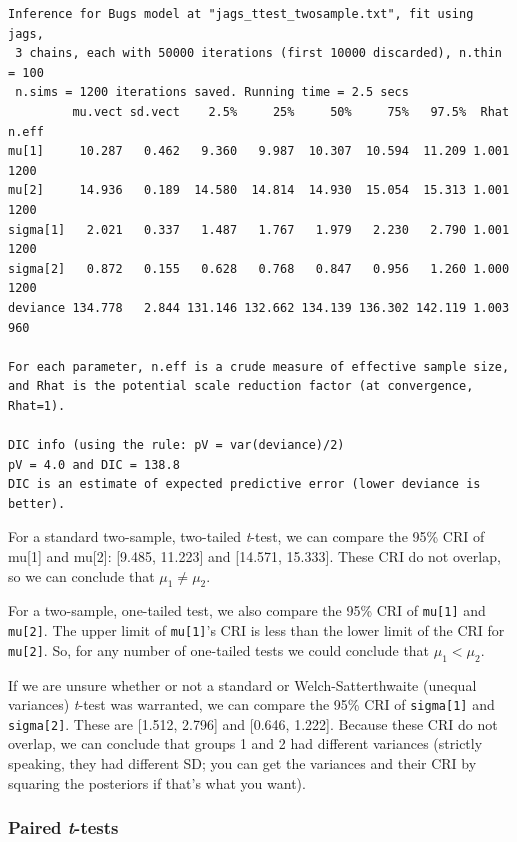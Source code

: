 \documentclass[
  13,
  letterpaper,
]{report}
\begin{document}
\begin{verbatim}
Inference for Bugs model at "jags_ttest_twosample.txt", fit using jags,
 3 chains, each with 50000 iterations (first 10000 discarded), n.thin = 100
 n.sims = 1200 iterations saved. Running time = 2.5 secs
         mu.vect sd.vect    2.5%     25%     50%     75%   97.5%  Rhat n.eff
mu[1]     10.287   0.462   9.360   9.987  10.307  10.594  11.209 1.001  1200
mu[2]     14.936   0.189  14.580  14.814  14.930  15.054  15.313 1.001  1200
sigma[1]   2.021   0.337   1.487   1.767   1.979   2.230   2.790 1.001  1200
sigma[2]   0.872   0.155   0.628   0.768   0.847   0.956   1.260 1.000  1200
deviance 134.778   2.844 131.146 132.662 134.139 136.302 142.119 1.003   960

For each parameter, n.eff is a crude measure of effective sample size,
and Rhat is the potential scale reduction factor (at convergence, Rhat=1).

DIC info (using the rule: pV = var(deviance)/2)
pV = 4.0 and DIC = 138.8
DIC is an estimate of expected predictive error (lower deviance is better).
\end{verbatim}

For a standard two-sample, two-tailed \emph{t}-test, we can compare the
95\% CRI of mu{[}1{]} and mu{[}2{]}: {[}9.485, 11.223{]} and {[}14.571,
15.333{]}. These CRI do not overlap, so we can conclude that
\(\mu_1\neq\mu_2\).

For a two-sample, one-tailed test, we also compare the 95\% CRI of
\texttt{mu{[}1{]}} and \texttt{mu{[}2{]}}. The upper limit of
\texttt{mu{[}1{]}}'s CRI is less than the lower limit of the CRI for
\texttt{mu{[}2{]}}. So, for any number of one-tailed tests we could
conclude that \(\mu_1<\mu_2\).

If we are unsure whether or not a standard or Welch-Satterthwaite
(unequal variances) \emph{t}-test was warranted, we can compare the 95\%
CRI of \texttt{sigma{[}1{]}} and \texttt{sigma{[}2{]}}. These are
{[}1.512, 2.796{]} and {[}0.646, 1.222{]}. Because these CRI do not
overlap, we can conclude that groups 1 and 2 had different variances
(strictly speaking, they had different SD; you can get the variances and
their CRI by squaring the posteriors if that's what you want).

\subsubsection{\texorpdfstring{Paired
\emph{t}-tests}{Paired t-tests}}\label{paired-t-tests}
\end{document}
